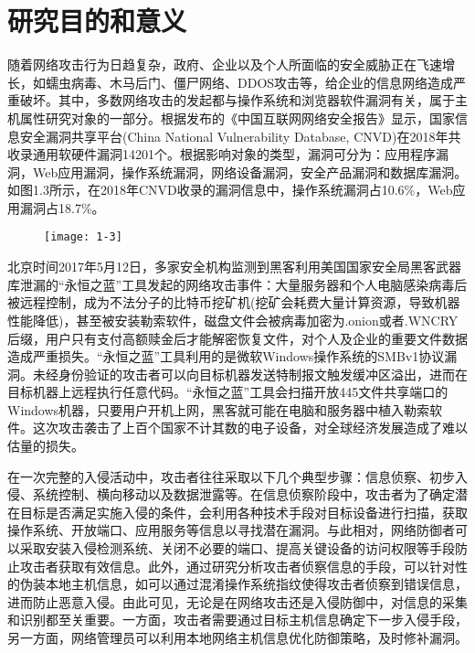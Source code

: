 \section{研究目的和意义}

随着网络攻击行为日趋复杂，政府、企业以及个人所面临的安全威胁正在飞速增长，如蠕虫病毒、木马后门、僵尸网络、DDOS攻击等，给企业的信息网络造成严重破坏。其中，多数网络攻击的发起都与操作系统和浏览器软件漏洞有关，属于主机属性研究对象的一部分。根据\cite{guo2018zhong}发布的《中国互联网网络安全报告》显示，国家信息安全漏洞共享平台(China National Vulnerability Database, CNVD)在2018年共收录通用软硬件漏洞14201个。根据影响对象的类型，漏洞可分为：应用程序漏洞，Web应用漏洞，操作系统漏洞，网络设备漏洞，安全产品漏洞和数据库漏洞。如图1.3所示，在2018年CNVD收录的漏洞信息中，操作系统漏洞占10.6\%，Web应用漏洞占18.7\%。
\begin{figure}[!htbp]
    \centering
    \texttt{[image: 1-3]}
\end{figure}

北京时间2017年5月12日，多家安全机构监测到黑客利用美国国家安全局黑客武器库泄漏的“永恒之蓝”工具发起的网络攻击事件：大量服务器和个人电脑感染病毒后被远程控制，成为不法分子的比特币挖矿机(挖矿会耗费大量计算资源，导致机器性能降低)，甚至被安装勒索软件，磁盘文件会被病毒加密为.onion或者.WNCRY后缀，用户只有支付高额赎金后才能解密恢复文件，对个人及企业的重要文件数据造成严重损失。“永恒之蓝”工具利用的是微软Windows操作系统的SMBv1协议漏洞。未经身份验证的攻击者可以向目标机器发送特制报文触发缓冲区溢出，进而在目标机器上远程执行任意代码。“永恒之蓝”工具会扫描开放445文件共享端口的Windows机器，只要用户开机上网，黑客就可能在电脑和服务器中植入勒索软件。这次攻击袭击了上百个国家不计其数的电子设备，对全球经济发展造成了难以估量的损失。

在一次完整的入侵活动中，攻击者往往采取以下几个典型步骤：信息侦察、初步入侵、系统控制、横向移动以及数据泄露等。在信息侦察阶段中，攻击者为了确定潜在目标是否满足实施入侵的条件，会利用各种技术手段对目标设备进行扫描，获取操作系统、开放端口、应用服务等信息以寻找潜在漏洞。与此相对，网络防御者可以采取安装入侵检测系统、关闭不必要的端口、提高关键设备的访问权限等手段防止攻击者获取有效信息。此外，通过研究分析攻击者侦察信息的手段，可以针对性的伪装本地主机信息，如可以通过混淆操作系统指纹使得攻击者侦察到错误信息，进而防止恶意入侵。由此可见，无论是在网络攻击还是入侵防御中，对信息的采集和识别都至关重要。一方面，攻击者需要通过目标主机信息确定下一步入侵手段，另一方面，网络管理员可以利用本地网络主机信息优化防御策略，及时修补漏洞。

